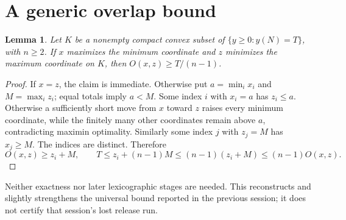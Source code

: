 \documentclass[11pt]{article}
\newtheorem{lemma}[theorem]{Lemma}
\begin{document}
\section{A generic overlap bound}
\begin{lemma}\label{lem:generic}
Let $K$ be a nonempty compact convex subset of
$\{y\ge0:y(N)=T\}$, with $n\ge2$. If $x$ maximizes the minimum
coordinate and $z$ minimizes the maximum coordinate on $K$, then
$O(x,z)\ge T/(n-1)$.
\end{lemma}
\begin{proof}
If $x=z$, the claim is immediate. Otherwise put $a=\min_i x_i$ and
$M=\max_i z_i$; equal totals imply $a<M$. Some index $i$ with $x_i=a$
has $z_i\le a$. Otherwise a sufficiently short move from $x$ toward $z$
raises every minimum coordinate, while the finitely many other coordinates
remain above $a$, contradicting maximin optimality. Similarly some index
$j$ with $z_j=M$ has $x_j\ge M$. The indices are distinct. Therefore
\[
 O(x,z)\ge z_i+M,\qquad
 T\le z_i+(n-1)M\le(n-1)(z_i+M)\le(n-1)O(x,z).
\]
\end{proof}
Neither exactness nor later lexicographic stages are needed. This
reconstructs and slightly strengthens the universal bound reported in the
previous session; it does not certify that session's lost release run.
\end{document}
